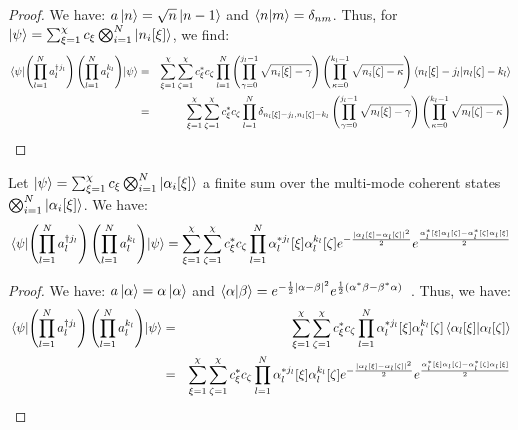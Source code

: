 \begin{proof}
    We have: $a \ket{n} = \sqrt{n} \ket{n-1}$ and $\braket{n}{m} = \delta_{n m}$. Thus, for $\ket{\psi} = \sum_{\xi=1}^\chi c_\xi
\bigotimes_{i=1}^N \ket{n_i[\xi]}$, we find:
\begin{eqnarray}
    \mel{\psi}{\left(\prod_{l=1}^N a^{\dagger j_l}_l\right) \left(\prod_{l=1}^N a^{k_l}_l\right)}{\psi} &=& \sum_{\xi=1}^\chi \sum_{\zeta=1}^\chi c^*_\xi c_\zeta \prod_{l=1}^N \left(\prod_{\gamma = 0}^{j_l - 1} \sqrt{n_i[\xi] - \gamma}\right) \left(\prod_{\kappa = 0}^{k_l - 1} \sqrt{n_i[\zeta] - \kappa}\right) \braket{n_l[\xi] - j_l}{n_l[\zeta] - k_l}\nonumber\\
    &=& \sum_{\xi=1}^\chi \sum_{\zeta=1}^\chi c^*_\xi c_\zeta \prod_{l=1}^N \delta_{n_l[\xi] - j_l, n_l[\zeta] - k_l} \left(\prod_{\gamma = 0}^{j_l - 1} \sqrt{n_l[\xi] - \gamma}\right) \left(\prod_{\kappa = 0}^{k_l - 1} \sqrt{n_l[\zeta] - \kappa}\right)\nonumber
\end{eqnarray}
\end{proof}

\begin{corollary}
    Let $\ket{\psi} = \sum_{\xi=1}^\chi c_\xi
\bigotimes_{i=1}^N \ket{\alpha_i[\xi]}$ a finite sum over the multi-mode coherent states $\bigotimes_{i=1}^N \ket{\alpha_i[\xi]}$. We have:
\begin{equation}
    \mel{\psi}{\left(\prod_{l=1}^N a^{\dagger j_l}_l\right) \left(\prod_{l=1}^N a^{k_l}_l\right)}{\psi} = \sum_{\xi=1}^\chi \sum_{\zeta=1}^\chi c^*_\xi c_\zeta \prod_{l=1}^N   \alpha^{* j_l}_l[\xi] \alpha^{k_l}_l[\zeta] e^{-\frac{|\alpha_l[\xi]-\alpha_l[\zeta]|^2}{2}} e^{\frac{\alpha^*_l[\xi]\alpha_l[\zeta] - \alpha^*_l[\zeta]\alpha_l[\xi]}{2}}
\end{equation}
\end{corollary}

\begin{proof}
    We have: $a \ket{\alpha} = \alpha \ket{\alpha}$ and $\braket{\alpha}{\beta} = e^{-\frac{1}{2}|\alpha-\beta|^2} e^{\frac{1}{2}(\alpha^*\beta - \beta^*\alpha)}$~\cite{explo_quant}. Thus, we have:
    \begin{eqnarray}
    \mel{\psi}{\left(\prod_{l=1}^N a^{\dagger j_l}_l\right) \left(\prod_{l=1}^N a^{k_l}_l\right)}{\psi} &=& \sum_{\xi=1}^\chi \sum_{\zeta=1}^\chi c^*_\xi c_\zeta \prod_{l=1}^N   \alpha^{* j_l}_l[\xi] \alpha^{k_l}_l[\zeta] \braket{\alpha_l[\xi]}{\alpha_l[\zeta]}\nonumber\\
    &=& \sum_{\xi=1}^\chi \sum_{\zeta=1}^\chi c^*_\xi c_\zeta \prod_{l=1}^N   \alpha^{* j_l}_l[\xi] \alpha^{k_l}_l[\zeta] e^{-\frac{|\alpha_l[\xi]-\alpha_l[\zeta]|^2}{2}} e^{\frac{\alpha^*_l[\xi]\alpha_l[\zeta] - \alpha^*_l[\zeta]\alpha_l[\xi]}{2}}\nonumber
\end{eqnarray}
\end{proof}

